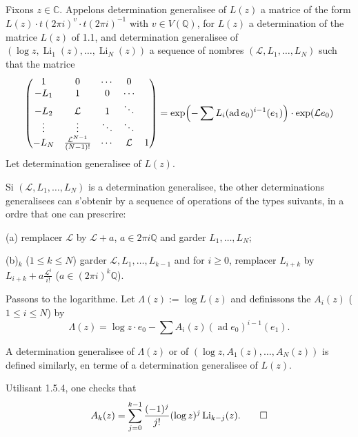 \documentclass[12pt,a4paper]{article}
\theoremstyle{plain}
\theoremstyle{definition}
\theoremstyle{remark}
\DeclareMathOperator{\ad}{ad}
\newcommand{\Q}{\mathbb{Q}}
\newcommand{\C}{\mathbb{C}}
\begin{document}
{{\subsection{}

Fixons $z\in\C$. Appelons determination generalisee of $L(z)$ a matrice of the form $L(z)\cdot t(2\pi i)^{v}\cdot t(2\pi i)^{-1}$ with $v\in V(\Q)$, for $L(z)$ a determination of the matrice $L(z)$ of 1.1, and determination generalisee of $(\log z,\operatorname{Li}_1(z),\ldots,\operatorname{Li}_N(z))$ a sequence of nombres $(\mathcal{L},L_1,\ldots,L_N)$ such that the matrice
\begin{equation*}
\begin{pmatrix}
1 & 0 & \cdots & 0\\
-L_1 & 1 & 0 & \cdots\\
-L_2 & \mathcal{L} & 1 & \ddots\\
\vdots & \vdots & \ddots & \ddots\\
-L_N & \frac{\mathcal{L}^{N-1}}{(N-1)!} & \cdots & \mathcal{L} & 1
\end{pmatrix}
= \exp\Bigl(-\sum L_i(\ad e_0)^{i-1}(e_1)\Bigr)\cdot\exp(\mathcal{L}e_0)
\end{equation*}
Let determination generalisee of $L(z)$.

Si $(\mathcal{L},L_1,\ldots,L_N)$ is a determination generalisee, the other determinations generalisees can s'obtenir by a sequence of operations of the types suivants, in a ordre that one can prescrire:

(a) remplacer $\mathcal{L}$ by $\mathcal{L}+a$, $a\in 2\pi i\Q$ and garder $L_1,\ldots,L_N$;

(b)$_k$ ($1\leq k\leq N$) garder $\mathcal{L},L_1,\ldots,L_{k-1}$ and for $i\geq 0$, remplacer $L_{i+k}$ by $L_{i+k}+a\frac{\mathcal{L}^i}{i!}$ ($a\in(2\pi i)^k\Q$).

Passons to the logarithme. Let $\Lambda(z):=\log L(z)$ and definissons the $A_i(z)$ ($1\leq i\leq N$) by
\begin{equation*}
\Lambda(z) = \log z\cdot e_0 - \sum A_i(z)(\ad e_0)^{i-1}(e_1).
\end{equation*}

A determination generalisee of $\Lambda(z)$ or of $(\log z,A_1(z),\ldots,A_N(z))$ is defined similarly, en terme of a determination generalisee of $L(z)$.

Utilisant 1.5.4, one checks that
\begin{equation*}
A_k(z) = \sum_{j=0}^{k-1}\frac{(-1)^j}{j!}(\log z)^j\operatorname{Li}_{k-j}(z).\qedhere
\end{equation*}

}}
\end{document}
